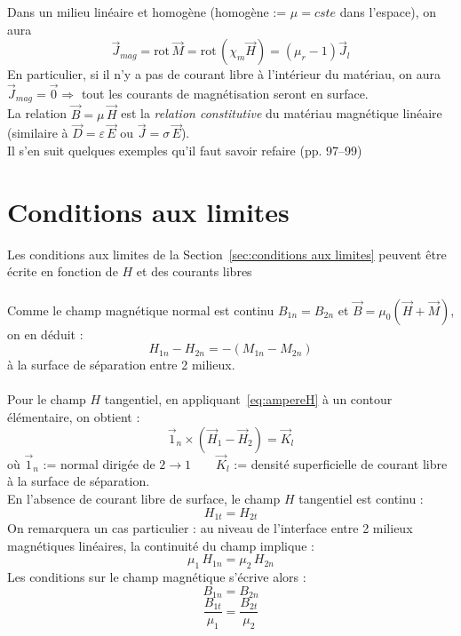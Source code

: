 \documentclass	[11pt, a4paper, openany]{book}
\newcommand{\E}{\vec E}
\newcommand{\rot}{\text{rot}\,}
\begin{document}
	Dans un milieu linéaire et homogène (homogène := $\mu=cste$ dans l'espace), on aura 
	\begin{equation}
		\vec J_{mag}=\rot\vec M=\rot\left(\chi_m\vec H\right)=(\mu_r-1)\vec J_{l}
	\end{equation}
	En particulier, si il n'y a pas de courant libre à l'intérieur du matériau, on aura $\vec J_{mag}=\vec{0}\Rightarrow$ tout les courants de magnétisation seront en surface.\\
	
	La relation $\vec B=\mu\,\vec H$ est la \textit{relation constitutive} du matériau magnétique linéaire (similaire à $\vec D=\varepsilon\,\vec E$ ou $\vec J=\sigma\,\E$).\\
	
	Il s'en suit quelques exemples qu'il faut savoir refaire (pp. 97--99)
	\setcounter{section}{4}
	\section{Conditions aux limites}\label{sec:conditions aux limites (magnétisme)}
	Les conditions aux limites de la Section~\ref{sec:conditions aux limites} peuvent être écrite en fonction de $H$ et des courants libres\\\\
	Comme le champ magnétique normal est continu $B_{1n}=B_{2n}$ et $\vec B=\mu_0\left(\vec H+\vec M\right)$, on en déduit :
	\begin{equation}
		H_{1n}-H_{2n}=-(M_{1n}-M_{2n})
	\end{equation}
	à la surface de séparation entre 2 milieux.\\\\
	Pour le champ $H$ tangentiel, en appliquant~\eqref{eq:ampereH} à un contour élémentaire, on obtient : 
	\begin{equation}
		\vec 1_n\times\left(\vec H_1-\vec H_2\right)=\vec K_{l}
	\end{equation}
	où $\vec 1_n$ := normal dirigée de $2\rightarrow 1\qquad\vec K_{l}$ := densité superficielle de courant libre à la surface de séparation.\\
	
	En l'absence de courant libre de surface, le champ $H$ tangentiel est continu : 
	\begin{equation}
		H_{1t}=H_{2t}
	\end{equation}
	On remarquera un cas particulier : au niveau de l'interface entre 2 milieux magnétiques linéaires, la continuité du champ implique :
	\begin{equation}
		\mu_1\, H_{1n}=\mu_2\, H_{2n}
	\end{equation}
	Les conditions sur le champ magnétique s'écrive alors : 
	$$
	B_{1n}=B_{2n}$$ $$
	\frac{B_{1t}}{\mu_1}=\frac{B_{2t}}{\mu_2}
	$$
\end{document}
